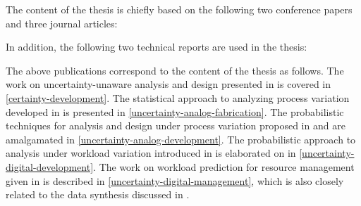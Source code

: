 The content of the thesis is chiefly based on the following two conference
papers and three journal articles:

\printbibliography[heading=none,keyword=own]

In addition, the following two technical reports are used in the thesis:

\printbibliography[heading=none,keyword=own-unpublished]

The above publications correspond to the content of the thesis as follows. The
work on uncertainty-unaware analysis and design presented in \cite{ukhov2012} is
covered in \cref{certainty-development}. The statistical approach to analyzing
process variation developed in \cite{ukhov2014a} is presented in
\cref{uncertainty-analog-fabrication}. The probabilistic techniques for analysis
and design under process variation proposed in \cite{ukhov2014b} and
\cite{ukhov2015} are amalgamated in \cref{uncertainty-analog-development}. The
probabilistic approach to analysis under workload variation introduced in
\cite{ukhov2017a} is elaborated on in \cref{uncertainty-digital-development}.
The work on workload prediction for resource management given in
\cite{ukhov2017b} is described in \cref{uncertainty-digital-management}, which
is also closely related to the data synthesis discussed in \cite{ukhov2017c}.

